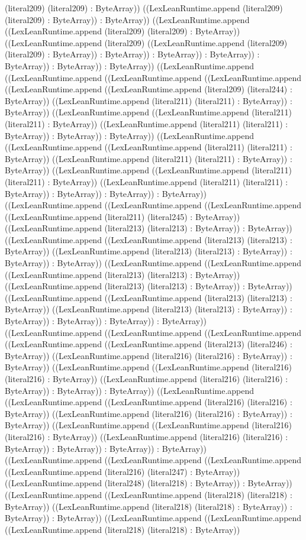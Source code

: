\documentclass[11pt]{article}
\begin{document}
(literal209) (literal209) : ByteArray)) ((LexLeanRuntime.append (literal209) (literal209) : ByteArray)) : ByteArray)) ((LexLeanRuntime.append ((LexLeanRuntime.append (literal209) (literal209) : ByteArray)) ((LexLeanRuntime.append (literal209) ((LexLeanRuntime.append (literal209) (literal209) : ByteArray)) : ByteArray)) : ByteArray)) : ByteArray)) : ByteArray)) : ByteArray)) : ByteArray)) ((LexLeanRuntime.append ((LexLeanRuntime.append ((LexLeanRuntime.append ((LexLeanRuntime.append ((LexLeanRuntime.append ((LexLeanRuntime.append (literal209) (literal244) : ByteArray)) ((LexLeanRuntime.append (literal211) (literal211) : ByteArray)) : ByteArray)) ((LexLeanRuntime.append ((LexLeanRuntime.append (literal211) (literal211) : ByteArray)) ((LexLeanRuntime.append (literal211) (literal211) : ByteArray)) : ByteArray)) : ByteArray)) ((LexLeanRuntime.append ((LexLeanRuntime.append ((LexLeanRuntime.append (literal211) (literal211) : ByteArray)) ((LexLeanRuntime.append (literal211) (literal211) : ByteArray)) : ByteArray)) ((LexLeanRuntime.append ((LexLeanRuntime.append (literal211) (literal211) : ByteArray)) ((LexLeanRuntime.append (literal211) (literal211) : ByteArray)) : ByteArray)) : ByteArray)) : ByteArray)) ((LexLeanRuntime.append ((LexLeanRuntime.append ((LexLeanRuntime.append ((LexLeanRuntime.append (literal211) (literal245) : ByteArray)) ((LexLeanRuntime.append (literal213) (literal213) : ByteArray)) : ByteArray)) ((LexLeanRuntime.append ((LexLeanRuntime.append (literal213) (literal213) : ByteArray)) ((LexLeanRuntime.append (literal213) (literal213) : ByteArray)) : ByteArray)) : ByteArray)) ((LexLeanRuntime.append ((LexLeanRuntime.append ((LexLeanRuntime.append (literal213) (literal213) : ByteArray)) ((LexLeanRuntime.append (literal213) (literal213) : ByteArray)) : ByteArray)) ((LexLeanRuntime.append ((LexLeanRuntime.append (literal213) (literal213) : ByteArray)) ((LexLeanRuntime.append (literal213) (literal213) : ByteArray)) : ByteArray)) : ByteArray)) : ByteArray)) : ByteArray)) ((LexLeanRuntime.append ((LexLeanRuntime.append ((LexLeanRuntime.append ((LexLeanRuntime.append ((LexLeanRuntime.append (literal213) (literal246) : ByteArray)) ((LexLeanRuntime.append (literal216) (literal216) : ByteArray)) : ByteArray)) ((LexLeanRuntime.append ((LexLeanRuntime.append (literal216) (literal216) : ByteArray)) ((LexLeanRuntime.append (literal216) (literal216) : ByteArray)) : ByteArray)) : ByteArray)) ((LexLeanRuntime.append ((LexLeanRuntime.append ((LexLeanRuntime.append (literal216) (literal216) : ByteArray)) ((LexLeanRuntime.append (literal216) (literal216) : ByteArray)) : ByteArray)) ((LexLeanRuntime.append ((LexLeanRuntime.append (literal216) (literal216) : ByteArray)) ((LexLeanRuntime.append (literal216) (literal216) : ByteArray)) : ByteArray)) : ByteArray)) : ByteArray)) ((LexLeanRuntime.append ((LexLeanRuntime.append ((LexLeanRuntime.append ((LexLeanRuntime.append (literal216) (literal247) : ByteArray)) ((LexLeanRuntime.append (literal248) (literal218) : ByteArray)) : ByteArray)) ((LexLeanRuntime.append ((LexLeanRuntime.append (literal218) (literal218) : ByteArray)) ((LexLeanRuntime.append (literal218) (literal218) : ByteArray)) : ByteArray)) : ByteArray)) ((LexLeanRuntime.append ((LexLeanRuntime.append ((LexLeanRuntime.append (literal218) (literal218) : ByteArray)) 
\end{document}
